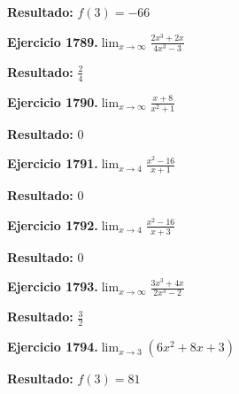 \documentclass[10pt,a4paper]{article}
\begin{document}
\begin{solbox}
\textbf{Resultado:} \(\displaystyle f(3) = -66\)
\end{solbox}

\newpage
\begin{ejbox}
\textbf{Ejercicio 1789.}\quad $\lim_{x\to \infty} \frac{2x^3 + 2x}{4x^3 - 3}$
\end{ejbox}

\begin{solbox}
\textbf{Resultado:} \(\displaystyle \frac{2}{4}\)
\end{solbox}

\begin{ejbox}
\textbf{Ejercicio 1790.}\quad $\lim_{x\to \infty} \frac{x + 8}{x^2 + 1}$
\end{ejbox}

\begin{solbox}
\textbf{Resultado:} \(\displaystyle 0\)
\end{solbox}

\begin{ejbox}
\textbf{Ejercicio 1791.}\quad $\lim_{x\to 4} \frac{x^2-16}{x+1}$
\end{ejbox}

\begin{solbox}
\textbf{Resultado:} \(\displaystyle 0\)
\end{solbox}

\newpage
\begin{ejbox}
\textbf{Ejercicio 1792.}\quad $\lim_{x\to 4} \frac{x^2-16}{x+3}$
\end{ejbox}

\begin{solbox}
\textbf{Resultado:} \(\displaystyle 0\)
\end{solbox}

\begin{ejbox}
\textbf{Ejercicio 1793.}\quad $\lim_{x\to \infty} \frac{3x^3 + 4x}{2x^3 - 2}$
\end{ejbox}

\begin{solbox}
\textbf{Resultado:} \(\displaystyle \frac{3}{2}\)
\end{solbox}

\begin{ejbox}
\textbf{Ejercicio 1794.}\quad $\lim_{x\to 3} (6x^2 +8x +3)$
\end{ejbox}

\begin{solbox}
\textbf{Resultado:} \(\displaystyle f(3) = 81\)
\end{solbox}
\end{document}

